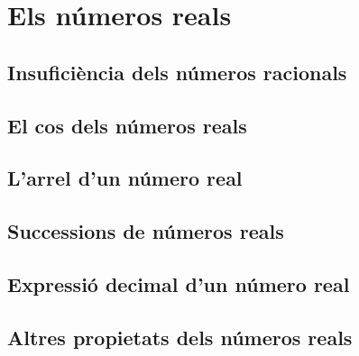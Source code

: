\section{Els números reals}
\subsection{Insuficiència dels números racionals}

\subsection{El cos dels números reals}

\subsection{L'arrel d'un número real}

\subsection{Successions de números reals}

\subsection{Expressió decimal d'un número real}

\subsection{Altres propietats dels números reals}
